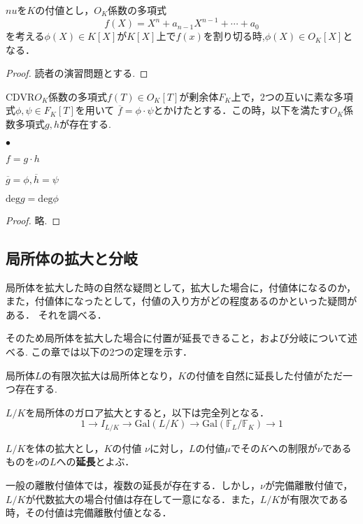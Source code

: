 \documentclass{ujarticle}
\renewenvironment{itemize}%
{%
   \begin{list}{\parbox{1zw}{$\bullet$}}%
   {%
      \setlength{\topsep}{0zh}
      \setlength{\itemindent}{0zw}
      \setlength{\leftmargin}{2zw}%
      \setlength{\rightmargin}{0zw}%
      \setlength{\labelsep}{1zw}%
      \setlength{\labelwidth}{3zw}%
      \setlength{\itemsep}{0em}%
      \setlength{\parsep}{0em}%
      \setlength{\listparindent}{0zw}%
   }
}{%
   \end{list}%
}
\begin{document}
\begin{prop}
 $nu$を$K$の付値とし，$O_K$係数の多項式
 \begin{equation*}
  f(X)= X^n + a_{n-1}X^{n-1} + \cdots + a_0
 \end{equation*}
を考える$\phi(X) \in K[X]$が$K[X]$上で$f(x)$を割り切る時,$\phi(X) \in O_K[X]$となる．
\end{prop}
\begin{proof}
 読者の演習問題とする.
\end{proof}


\begin{thm}
CDVR$O_K$係数の多項式$f(T) \in O_K[T]$が剰余体$ F_K$上で，2つの互いに素な多項式$\phi,\psi \in F_K[T]$を用いて
$\overline{f}=\phi \cdot \psi$とかけたとする．この時，以下を満たす$O_K$係数多項式$g,h$が存在する.
\begin{itemize}
  \item $f=g \cdot h$
  \item $\overline{g}=\phi,\overline{h}=\psi$
  \item $\mathrm{deg}g=\mathrm{deg}\phi$
\end{itemize}
\end{thm}
\begin{proof}
 略.
\end{proof}


\subsection{局所体の拡大と分岐}
\label{sub:局所体の拡大と分岐}
局所体を拡大した時の自然な疑問として，拡大した場合に，付値体になるのか，
また，付値体になったとして，付値の入り方がどの程度あるのかといった疑問がある．
それを調べる．

そのため局所体を拡大した場合に付置が延長できること，および分岐について述べる.
この章では以下の2つの定理を示す．
\begin{thm}
 局所体$L$の有限次拡大は局所体となり，$K$の付値を自然に延長した付値がただ一つ存在する.
\end{thm}
\begin{thm}
 $L/K$を局所体のガロア拡大とすると，以下は完全列となる．
 \begin{equation}
   1 \to I_{L/K} \to \mathrm{Gal}(L/K) \to \mathrm{Gal}(\mathbb{F}_L/\mathbb{F}_K) \to 1
 \end{equation}
\end{thm}


\begin{dfn}
 $L/K$を体の拡大とし，$K$の付値 $\nu$に対し，$L$の付値$\mu$でその$K$への制限が$\nu$であるものを$\nu$の$L$への\textbf{延長}とよぶ．
\end{dfn}
\begin{rem}
 一般の離散付値体では，複数の延長が存在する．しかし，$\nu$が完備離散付値で，$L/K$が代数拡大の場合付値は存在して一意になる．また，$L/K$が有限次である時，その付値は完備離散付値となる．
\end{rem}
\end{document}
